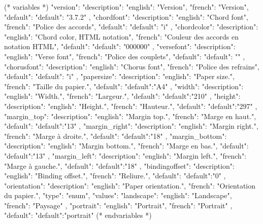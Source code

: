 (* variables *)
{
"version":{ "description": {"english": "Version", "french": "Version"},
            "default": {"default": "3.7.2"}
         },
"chordfont":{ "description": {"english": "Chord font",
                          "french": "Police des accords"},
            "default": {"default": "i"}
         },
"chordcolor":{ "description": {"english": "Chord color, HTML notation",
                          "french": "Couleur des accords en notation HTML"},
            "default": {"default": "000000"}
         },
"versefont":{ "description": {"english": "Verse font",
                          "french": "Police des couplets"},
            "default": {"default": ""}
         },
"chorusfont":{ "description": {"english": "Chorus font",
                          "french": "Police des refrains"},
            "default": {"default": "i"}
         },
"papersize":{ "description": {"english": "Paper size.",
                          "french": "Taille du papier."},
            "default": {"default":"A4"}
         },
"width":{ "description": {"english": "Width.",
                          "french": "Largeur."},
            "default": {"default":"210"}
         },
"height":{ "description": {"english": "Height.",
                          "french": "Hauteur."},
            "default": {"default":"297"}
         },
"margin_top":{ "description": {"english": "Margin top.",
                          "french": "Marge en haut."},
            "default": {"default":"13"}
         },
"margin_right":{ "description": {"english": "Margin right.",
                          "french": "Marge à droite."},
            "default": {"default":"18"}
         },
"margin_bottom":{ "description": {"english": "Margin bottom.",
                          "french": "Marge en bas."},
            "default": {"default":"13"}
         },
"margin_left":{ "description": {"english": "Margin left.",
                          "french": "Marge à gauche."},
            "default": {"default":"18"}
         },
"bindingoffset":{ "description": {"english": "Binding offset.",
                          "french": "Reliure."},
            "default": {"default":"0"}
         },
"orientation":{ "description": {"english": "Paper orientation.",
                          "french": "Orientation du papier."},
            "type": "enum",
            "values": {"landscape": {"english": "Landscape", "french": "Paysage" },
                       "portrait": {"english": "Portrait", "french": "Portrait" }
                     },
            "default": {"default":"portrait"}
         }
}
(* endvariables *)

